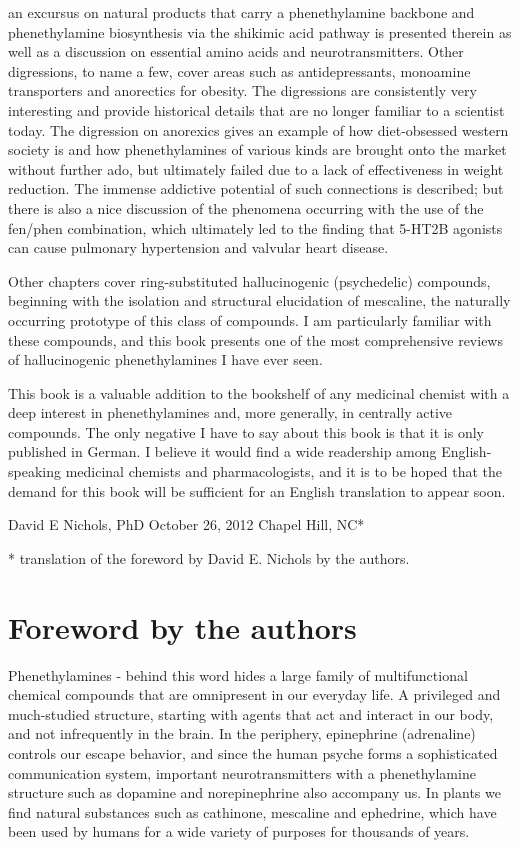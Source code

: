 an excursus on natural products that carry a phenethylamine backbone and phenethylamine biosynthesis via the shikimic acid pathway is presented therein as well as a discussion on essential amino acids and neurotransmitters. Other digressions, to name a few, cover areas such as antidepressants, monoamine transporters and anorectics for obesity. The digressions are consistently very interesting and provide historical details that are no longer familiar to a scientist today. The digression on anorexics gives an example of how diet-obsessed western society is and how phenethylamines of various kinds are brought onto the market without further ado, but ultimately failed due to a lack of effectiveness in weight reduction. The immense addictive potential of such connections is described; but there is also a nice discussion of the phenomena occurring with the use of the fen/phen combination, which ultimately led to the finding that 5-HT2B agonists can cause pulmonary hypertension and valvular heart disease.

Other chapters cover ring-substituted hallucinogenic (psychedelic) compounds, beginning with the isolation and structural elucidation of mescaline, the naturally occurring prototype of this class of compounds. I am particularly familiar with these compounds, and this book presents one of the most comprehensive reviews of hallucinogenic phenethylamines I have ever seen.

This book is a valuable addition to the bookshelf of any medicinal chemist with a deep interest in phenethylamines and, more generally, in centrally active compounds. The only negative I have to say about this book is that it is only published in German. I believe it would find a wide readership among English-speaking medicinal chemists and pharmacologists, and it is to be hoped that the demand for this book will be sufficient for an English translation to appear soon.

David E Nichols, PhD
October 26, 2012
Chapel Hill, NC*


* translation of the foreword by David E. Nichols by the authors.
\clearpage

\section{Foreword by the authors}
Phenethylamines - behind this word hides a large family of multifunctional chemical compounds that are omnipresent in our everyday life. A privileged and much-studied structure, starting with agents that act and interact in our body, and not infrequently in the brain. In the periphery, epinephrine (adrenaline) controls our escape behavior, and since the human psyche forms a sophisticated communication system, important neurotransmitters with a phenethylamine structure such as dopamine and norepinephrine also accompany us. In plants we find natural substances such as cathinone, mescaline and ephedrine, which have been used by humans for a wide variety of purposes for thousands of years.

